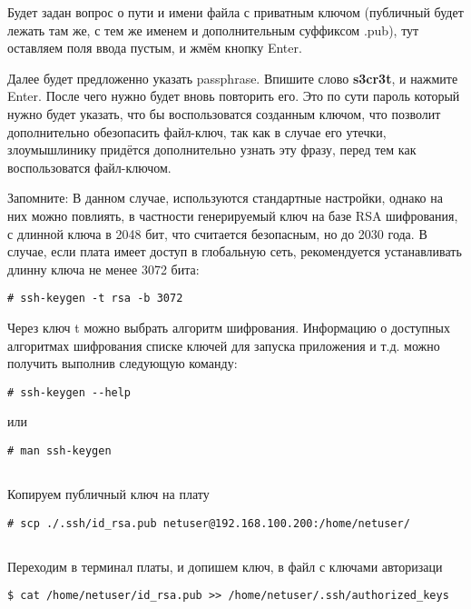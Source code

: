 Будет задан вопрос о пути и имени файла с приватным ключом (публичный будет лежать там же, с тем же именем и дополнительным суффиксом .pub), тут оставляем поля ввода пустым, и жмём кнопку Enter.

Далее будет предложенно указать passphrase. Впишите слово \textbf{s3cr3t}\label{ssh:passphrase}, и нажмите Enter. После чего нужно будет вновь повторить его. Это по сути пароль который нужно будет указать, что бы воспользоватся созданным ключом, что позволит дополнительно обезопасить файл-ключ, так как в случае его утечки, злоумышлинику придётся дополнительно узнать эту фразу, перед тем как воспользоватся файл-ключом.  

\begin{Notes}{Запомните:}
	В данном случае, используются стандартные настройки, однако на них можно повлиять, в частности генерируемый ключ на базе RSA шифрования, с длинной ключа в 2048 бит, что считается безопасным, но до 2030 года. В случае, если плата имеет доступ в глобальную сеть, рекомендуется устанавливать длинну ключа не менее 3072 бита:
	\begin{lstlisting}[style=bash]
	# ssh-keygen -t rsa -b 3072
	\end{lstlisting}
	
	Через ключ t можно выбрать алгоритм шифрования. Информацию о доступных алгоритмах шифрования списке ключей для запуска приложения и т.д. можно получить выполнив следующую команду:
	\begin{lstlisting}[style=bash]
	# ssh-keygen --help
	\end{lstlisting}
	или
	\begin{lstlisting}[style=bash]
	# man ssh-keygen
	\end{lstlisting}
\end{Notes}


\subsection{}Копируем публичный ключ на плату
\begin{lstlisting}[style=bash]
# scp ./.ssh/id_rsa.pub netuser@192.168.100.200:/home/netuser/
\end{lstlisting}

\subsection{}Переходим в терминал платы, и допишем ключ, в файл с ключами авторизаци
\begin{lstlisting}[style=bash]
$ cat /home/netuser/id_rsa.pub >> /home/netuser/.ssh/authorized_keys
\end{lstlisting}

